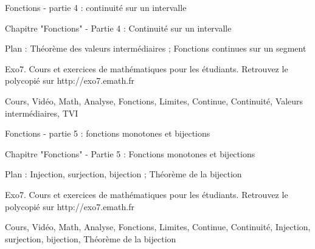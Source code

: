 Fonctions - partie 4 : continuité sur un intervalle



Chapitre "Fonctions" - Partie 4 : Continuité sur un intervalle

Plan : Théorème des valeurs intermédiaires ; Fonctions continues sur un segment

Exo7. Cours et exercices de mathématiques pour les étudiants.
Retrouvez le polycopié sur http://exo7.emath.fr


Cours, Vidéo, Math, Analyse, Fonctions, Limites, Continue, Continuité, Valeurs intermédiaires, TVI 



Fonctions - partie 5 : fonctions monotones et bijections



Chapitre "Fonctions" - Partie 5 : Fonctions monotones et bijections

Plan : Injection, surjection, bijection ; Théorème de la bijection

Exo7. Cours et exercices de mathématiques pour les étudiants.
Retrouvez le polycopié sur http://exo7.emath.fr


Cours, Vidéo, Math, Analyse, Fonctions, Limites, Continue, Continuité,  Injection, surjection, bijection, Théorème de la bijection

